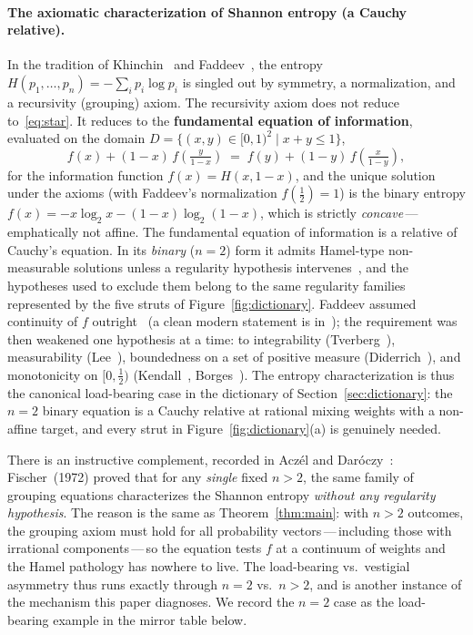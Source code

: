 \documentclass{article}
\theoremstyle{plain}
\theoremstyle{definition}
\begin{document}
\paragraph{The axiomatic characterization of Shannon entropy (a Cauchy relative).}
In the tradition of Khinchin~\cite{Khinchin1957} and
Faddeev~\cite{Faddeev1957}, the entropy
$H(p_1,\ldots,p_n)=-\sum_i p_i\log p_i$ is singled out by symmetry, a
normalization, and a recursivity (grouping) axiom. The recursivity
axiom does not reduce to~\eqref{eq:star}. It reduces to the
\textbf{fundamental equation of information}, evaluated on the domain $D = \{(x, y) \in [0, 1)^2 \mid x + y \le 1\}$,
\[
f(x)+(1-x)\,f\!\left(\tfrac{y}{1-x}\right)
\;=\;f(y)+(1-y)\,f\!\left(\tfrac{x}{1-y}\right),
\]
for the information function $f(x)=H(x,1-x)$, and the unique solution
under the axioms (with Faddeev's normalization $f(\tfrac12)=1$) is the
binary entropy $f(x)=-x\log_2 x-(1-x)\log_2(1-x)$, which is strictly
\emph{concave}\,---\,emphatically not affine. The fundamental
equation of information is a relative of Cauchy's equation. In its
\emph{binary} ($n=2$) form it admits Hamel-type non-measurable
solutions unless a regularity hypothesis intervenes~\cite{AczelDaroczy1975},
and the hypotheses used to exclude them belong to the same regularity families represented by the five struts of Figure~\ref{fig:dictionary}. Faddeev assumed continuity of
$f$ outright~\cite{Faddeev1957} (a clean modern statement is
in~\cite{BaezFritzLeinster2011}); the requirement was then weakened
one hypothesis at a time: to integrability (Tverberg~\cite{Tverberg1958}),
measurability (Lee~\cite{Lee1964}), boundedness on a set of positive
measure (Diderrich~\cite{Diderrich1975}), and monotonicity on
$[0,\tfrac{1}{2})$ (Kendall~\cite{Kendall1964}, Borges~\cite{Borges1967}).
The entropy characterization is thus the canonical load-bearing case
in the dictionary of Section~\ref{sec:dictionary}: the $n=2$ binary
equation is a Cauchy relative at rational mixing weights with a
non-affine target, and every strut in Figure~\ref{fig:dictionary}(a)
is genuinely needed.

There is an instructive complement, recorded in Acz\'el and
Dar\'oczy~\cite{AczelDaroczy1975}: Fischer~(1972) proved that for any
\emph{single} fixed $n>2$, the same family of grouping equations
characterizes the Shannon entropy \emph{without any regularity
hypothesis}. The reason is the same as Theorem~\ref{thm:main}: with
$n>2$ outcomes, the grouping axiom must hold for all probability
vectors\,---\,including those with irrational components\,---\,so the
equation tests $f$ at a continuum of weights and the Hamel pathology
has nowhere to live. The load-bearing vs.\ vestigial asymmetry thus
runs exactly through $n=2$ vs.\ $n>2$, and is another
instance of the mechanism this paper diagnoses. We record the $n=2$
case as the load-bearing example in the mirror table below.
\end{document}
